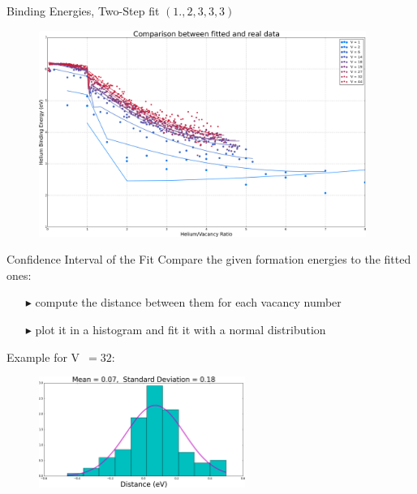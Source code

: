 \documentclass[10pt]{beamer}
\begin{document}
\begin{frame}{Binding Energies, Two-Step fit $(1., 2, 3, 3, 3)$}
	\begin{figure}
        \includegraphics[width=0.95\textwidth]{bindingFit1D_23331}
    \end{figure}
\end{frame}

\begin{frame}{Confidence Interval of the Fit}
	\large
	Compare the given formation energies to the fitted ones:
    \begin{itemize}
      	\item[$\blacktriangleright$] compute the distance between them for each
      	vacancy number
      	\item[$\blacktriangleright$] plot it in a histogram and fit it with a
      	normal distribution \newline
    \end{itemize}
    \normalsize
    Example for V~$=32$: 
	\begin{figure}
        \includegraphics[width=0.6\textwidth]{confidenceInterval32}
    \end{figure}
\end{frame}
\end{document}
